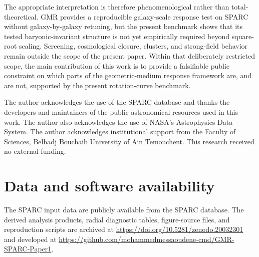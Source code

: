 ﻿\documentclass[twocolumn,linenumbers]{aastex701}
\begin{document}
The appropriate interpretation is therefore phenomenological rather than total-theoretical. GMR provides a reproducible galaxy-scale response test on SPARC without galaxy-by-galaxy retuning, but the present benchmark shows that its tested baryonic-invariant structure is not yet empirically required beyond square-root scaling. Screening, cosmological closure, clusters, and strong-field behavior remain outside the scope of the present paper. Within that deliberately restricted scope, the main contribution of this work is to provide a falsifiable public constraint on which parts of the geometric-medium response framework are, and are not, supported by the present rotation-curve benchmark.





 \begin{acknowledgments}
The author acknowledges the use of the SPARC database and thanks the developers and maintainers of the public astronomical resources used in this work. The author also acknowledges the use of NASA's Astrophysics Data System. The author acknowledges institutional support from the Faculty of Sciences, Belhadj Bouchaib University of Ain Temouchent. This research received no external funding.

\end{acknowledgments}
\section{Data and software availability}

The SPARC input data are publicly available from the SPARC database. The derived analysis products, radial diagnostic tables, figure-source files, and reproduction scripts are archived at \url{https://doi.org/10.5281/zenodo.20032301} and developed at \url{https://github.com/mohammedmessaoudene-cmd/GMR-SPARC-Paper1}.


 
 
\end{document}

